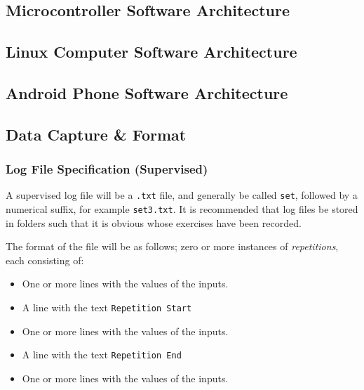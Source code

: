 \documentclass[a4paper]{article}
\begin{document}
\subsection{Microcontroller Software Architecture}%


\subsection{Linux Computer Software Architecture}%


\subsection{Android Phone Software Architecture}%


\subsection{Data Capture \& Format}%


\subsubsection{Log File Specification (Supervised)}

A supervised log file will be a \lstinline{.txt} file, and generally be called \lstinline{set}, followed by a numerical suffix, for example \lstinline{set3.txt}. It is recommended that log files be stored in folders such that it is obvious whose exercises have been recorded.

The format of the file will be as follows; zero or more instances of \emph{repetitions}, each consisting of:

\begin{itemize}
\item One or more lines with the values of the inputs.
\item A line with the text \lstinline{Repetition Start}
\item One or more lines with the values of the inputs.
\item A line with the text \lstinline{Repetition End}
\item One or more lines with the values of the inputs.
\end{itemize}
\end{document}
